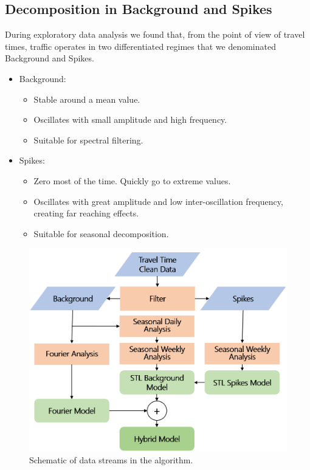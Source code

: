\documentclass[letterpaper, 10 pt, conference]{ieeeconf}  %
\begin{document}
\subsection{Decomposition in Background and Spikes}
During exploratory data analysis we found that, from the point of view of travel times, traffic operates in two differentiated regimes that we denominated Background and Spikes. 
\begin{itemize}
	\item Background: 
	\begin{itemize}
		\item Stable around a mean value.
		\item Oscillates with small amplitude and high frequency.
		\item Suitable for spectral filtering.
	\end{itemize}
	\item Spikes: 
	\begin{itemize}
		\item Zero most of the time. Quickly go to extreme values.
		\item Oscillates with great amplitude and low inter-oscillation frequency, creating far reaching effects.
		\item Suitable for seasonal decomposition.
	\end{itemize}
\end{itemize}

\begin{figure}[htbp]
	\centering
	\includegraphics[width=\linewidth]{new_flow2.png}
	\caption{Schematic of data streams in the algorithm.}
	\label{fig:flowchart}
\end{figure}
\end{document}
